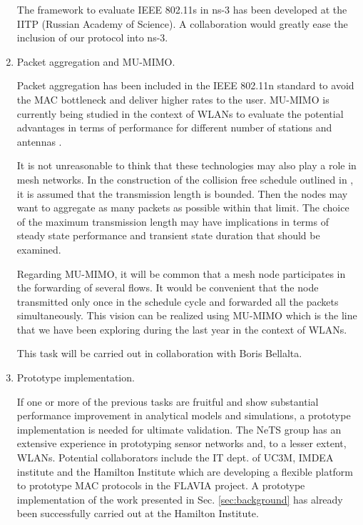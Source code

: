 \documentclass[a4paper,twocolumns]{article}%
\begin{document}
\begin{enumerate}
The framework to evaluate IEEE 802.11s in ns-3 has been developed at the IITP (Russian Academy of Science).
A collaboration would greatly ease the inclusion of our protocol into ns-3.

 \item Packet aggregation and MU-MIMO.

Packet aggregation has been included in the IEEE 802.11n standard to avoid the MAC bottleneck and deliver higher rates to the user.
MU-MIMO is currently being studied in the context of WLANs to evaluate the potential advantages in terms of performance for different number of stations and antennas \cite{bellalta2011rqp}.

It is not unreasonable to think that these technologies may also play a role in mesh networks.
In the construction of the collision free schedule outlined in \cite{barcelo2011cfo}, it is assumed that the transmission length is bounded.
Then the nodes may want to aggregate as many packets as possible within that limit.
The choice of the maximum transmission length may have implications in terms of steady state performance and transient state duration that should be examined.

Regarding MU-MIMO, it will be common that a mesh node participates in the forwarding of several flows.
It would be convenient that the node transmitted only once in the schedule cycle and forwarded all the packets simultaneously.
This vision can be realized using MU-MIMO which is the line that we have been exploring during the last year in the context of WLANs.

This task will be carried out in collaboration with Boris Bellalta.

 \item Prototype implementation.

If one or more of the previous tasks are fruitful and show substantial performance improvement in analytical models and simulations, a prototype implementation is needed for ultimate validation.
The NeTS group has an extensive experience in prototyping sensor networks and, to a lesser extent, WLANs. Potential collaborators include the IT dept. of UC3M, IMDEA institute and the Hamilton Institute which are developing a flexible platform to prototype MAC protocols in the FLAVIA project.
A prototype implementation of the work presented in Sec. \ref{sec:background} has already been successfully carried out at the Hamilton Institute.

\end{enumerate}
\end{document}
